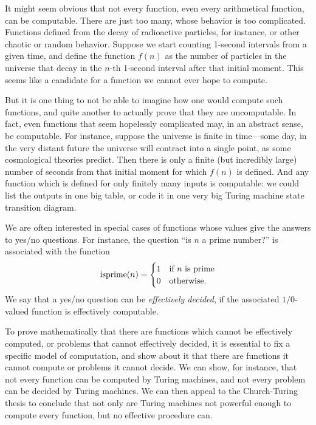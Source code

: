 \documentclass[../../../include/open-logic-section]{subfiles}
\begin{document}

It might seem obvious that not every function, even every arithmetical
function, can be computable. There are just too many, whose behavior
is too complicated.  Functions defined from the decay of radioactive
particles, for instance, or other chaotic or random behavior. Suppose
we start counting 1-second intervals from a given time, and define the
function $f(n)$ as the number of particles in the universe that decay
in the $n$-th 1-second interval after that initial moment.  This seems
like a candidate for a function we cannot ever hope to compute.

But it is one thing to not be able to imagine how one would compute
such functions, and quite another to actually prove that they are
uncomputable.  In fact, even functions that seem hopelessly
complicated may, in an abstract sense, be computable.  For instance,
suppose the universe is finite in time---some day, in the very distant
future the universe will contract into a single point, as some
cosmological theories predict. Then there is only a finite (but
incredibly large) number of seconds from that initial moment for which
$f(n)$ is defined.  And any function which is defined for only finitely
many inputs is computable: we could list the outputs in one big table,
or code it in one very big Turing machine state transition diagram.

We are often interested in special cases of functions whose values give
the answers to yes/no questions.  For instance, the question ``is $n$
a prime number?'' is associated with the function
\[
\fn{isprime}(n) = \begin{cases}
  1 & \text{if $n$ is prime}\\
  0 & \text{otherwise.}
  \end{cases}
\]
We say that a yes/no question can be \emph{effectively decided}, if
the associated $1/0$-valued function is effectively computable.

To prove mathematically that there are functions which cannot be
effectively computed, or problems that cannot effectively decided, it
is essential to fix a specific model of computation, and show about it
that there are functions it cannot compute or problems it cannot
decide.  We can show, for instance, that not every function can be
computed by Turing machines, and not every problem can be decided by
Turing machines.  We can then appeal to the Church-Turing thesis to
conclude that not only are Turing machines not powerful enough to
compute every function, but no effective procedure can.
\end{document}
